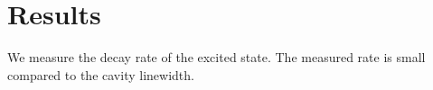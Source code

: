 \documentclass{article}
\begin{document}
\section{Results}
We measure the decay rate of the excited state.
The measured rate is small compared to the cavity linewidth.
\end{document}
